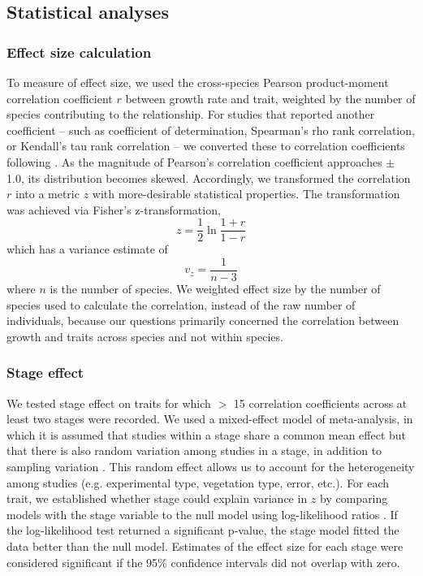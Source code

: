 \documentclass[a4paper,11pt]{article}
\begin{document}
\subsection*{Statistical analyses}\label{statistical-analyses}

\subsubsection*{Effect size calculation}\label{effect-size}

To measure of effect size, we used the cross-species Pearson product-moment correlation coefficient $r$ between growth rate and trait, weighted by the number of species contributing to the relationship. For studies that reported another coefficient -- such as coefficient of determination, Spearman's rho rank correlation, or Kendall's tau rank correlation -- we converted these to correlation coefficients following \citet{Lajeunesse:2013tm}. As the magnitude of Pearson's correlation coefficient approaches $\pm$ 1.0, its distribution becomes skewed. Accordingly, we transformed the correlation $r$ into a metric $z$ with more-desirable statistical properties. The transformation was achieved via Fisher's z-transformation,
\[ z = \frac{1}{2} \ln \frac{1+r}{1-r}\]
which has a variance estimate of
\[ v_z= \frac{1}{n-3}\]
where $n$ is the number of species. We weighted effect size by the number of species used to calculate the correlation, instead of the raw number of individuals, because our questions primarily concerned the correlation between growth and traits across species and not within species.

\subsubsection*{Stage effect}\label{stage-effect}

We tested stage effect on traits for which $>$ 15 correlation coefficients across at least two stages were recorded. We used a mixed-effect model of meta-analysis, in which it is assumed that studies within a stage share a common mean effect but that there is also random variation among studies in a stage, in addition to sampling variation \citep{Zuur:2009cfa}. This random effect allows us to account for the heterogeneity among studies (e.g. experimental type, vegetation type, error, etc.). For each trait, we established whether stage could explain variance in $z$ by comparing models with the stage variable to the null model using log-likelihood ratios \citep{Zuur:2009cfa}. If the log-likelihood test returned a significant p-value, the stage model fitted the data better than the null model. Estimates of the effect size for each stage were considered significant if the 95\% confidence intervals did not overlap with zero.
\end{document}
